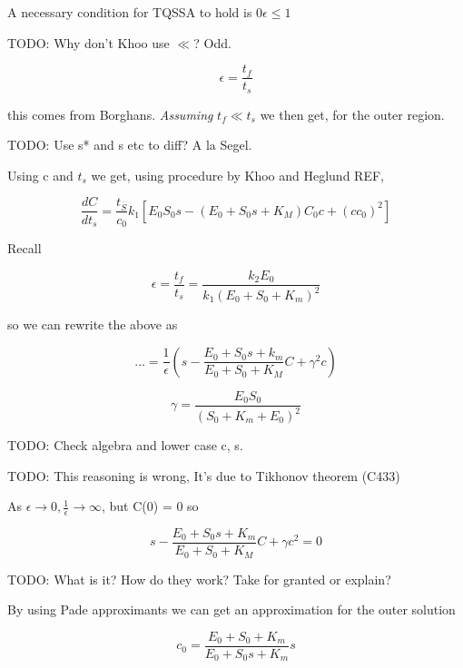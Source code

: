 \documentclass[12pt]{article}
\begin{document}
A necessary condition for TQSSA to hold is $0 \epsilon \leq 1$

TODO: Why don't Khoo use $\ll$? Odd.

\begin{equation}
\epsilon = \frac{t_f}{t_s}
\end{equation}

this comes from Borghans. \textit{Assuming} $t_f \ll t_s$ we then get, for the
outer region.

TODO: Use s* and s etc to diff? A la Segel.

Using c and $t_s$ we get, using procedure by Khoo and Heglund REF,

\begin{equation}
\frac{dC}{dt_s} = \frac{t_{\overline{S}}}{c_0} k_1 [E_0 S_0 s - (E_0 + S_0 s +
K_M) C_0 c + (c c_0)^2]
\end{equation}

Recall

\begin{equation}
\epsilon = \frac{t_f}{t_s} = \frac{k_2 E_0}{k_1(E_0+S_0+K_m)^2}
\end{equation}

so we can rewrite the above as

\begin{equation}
... = \frac{1}{\epsilon} (s - \frac{E_0+S_0 s + k_m}{E_0 + S_0+ K_M}C + \gamma^2
c)
\end{equation}

\begin{equation}
\gamma = \frac{E_0 S_0}{(S_0 + K_m + E_0)^2}
\end{equation}

TODO: Check algebra and lower case c, s.

TODO: This reasoning is wrong, It's due to Tikhonov theorem (C433)

As $\epsilon \to 0, \frac{1}{\epsilon} \to \infty$, but C(0) = 0 so

\begin{equation}
s - \frac{E_0 + S_0 s + K_m}{E_0 + S_0 + K_M}C + \gamma c^2 = 0
\end{equation}

TODO: What is it? How do they work? Take for granted or explain?

By using Pade approximants we can get an approximation for the outer
solution

\begin{equation}
c_0  = \frac{E_0 + S_0 + K_m}{E_0 + S_0 s + K_m} s
\end{equation}
\end{document}
